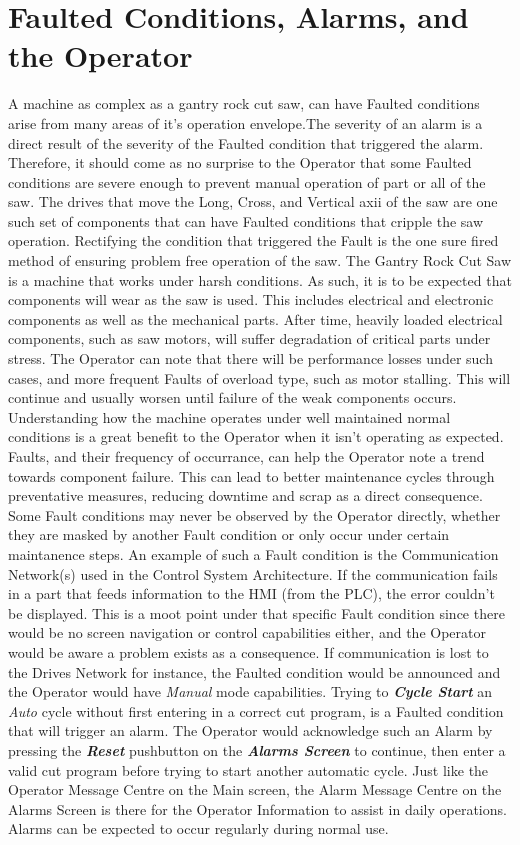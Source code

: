 \section{Faulted Conditions, Alarms, and the Operator} A machine as complex as a gantry rock cut saw, can have Faulted conditions arise from many areas of it's operation envelope.The severity of an alarm is a direct result of the severity of the Faulted condition that triggered the alarm. Therefore, it should come as no surprise to the Operator that some Faulted conditions are severe enough to prevent manual operation of part or all of the saw. The drives that move the Long, Cross, and Vertical axii of the saw are one such set of components that can have Faulted conditions that cripple the saw operation. Rectifying the condition that triggered the Fault is the one sure fired method of ensuring problem free operation of the saw. The Gantry Rock Cut Saw is a machine that works under harsh conditions. As such, it is to be expected that components will wear as the saw is used. This includes electrical and electronic components as well as the mechanical parts. After time, heavily loaded electrical components, such as saw motors, will suffer degradation of critical parts under stress. The Operator can note that there will be performance losses under such cases, and more frequent Faults of overload type, such as motor stalling. This will continue and usually worsen until failure of the weak components occurs. Understanding how the machine operates under well maintained normal conditions is a great benefit to the Operator when it isn't operating as expected. Faults, and their frequency of occurrance, can help the Operator note a trend towards component failure. This can lead to better maintenance cycles through preventative measures, reducing downtime and scrap as a direct consequence. Some Fault conditions may never be observed by the Operator directly, whether they are masked by another Fault condition or only occur under certain maintanence steps. An example of such a Fault condition is the Communication Network(s) used in the Control System Architecture. If the communication fails in a part that feeds information to the HMI (from the PLC), the error couldn't be displayed. This is a moot point under that specific Fault condition since there would be no screen navigation or control capabilities either, and the Operator would be aware a problem exists as a consequence. If communication is lost to the Drives Network for instance, the Faulted condition would be announced and the Operator would have \textit{Manual} mode capabilities. Trying to \textbf{\textit{Cycle Start}} an \textit{Auto} cycle without first entering in a correct cut program, is a Faulted condition that will trigger an alarm. The Operator would acknowledge such an Alarm by pressing the \textbf{\textit{Reset}} pushbutton on the \textbf{\textit{Alarms Screen}} to continue, then enter a valid cut program before trying to start another automatic cycle. Just like the Operator Message Centre on the Main screen, the Alarm Message Centre on the Alarms Screen is there for the Operator Information to assist in daily operations. Alarms can be expected to occur regularly during normal use. 
